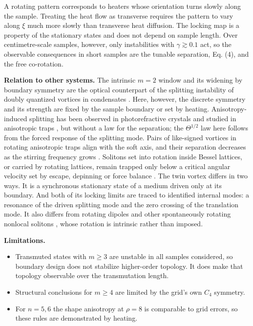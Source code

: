 A rotating pattern corresponds to heaters whose orientation turns slowly along the sample. Treating the heat flow as transverse requires the pattern to vary along \(\xi\) much more slowly than transverse heat diffusion. The locking map is a property of the stationary states and does not depend on sample length. Over centimetre-scale samples, however, only instabilities with \(\gamma \gtrsim 0.1\) act, so the observable consequences in short samples are the tunable separation, Eq. (4), and the free co-rotation.

\textbf{Relation to other systems.} The intrinsic \(m = 2\) window and its widening by boundary symmetry are the optical counterpart of the splitting instability of doubly quantized vortices in condensates \citep{Skryabin2001, Mottonen2003split, Shin2004dqv, Lundh2006, Kapitula2013krein}. Here, however, the discrete symmetry and its strength are fixed by the sample boundary or set by heating. Anisotropy-induced splitting has been observed in photorefractive crystals \citep{Mamaev1997decay} and studied in anisotropic traps \citep{Mottonen2003split, Xiong2020ring}, but without a law for the separation; the \(\Theta^{1/2}\) law here follows from the forced response of the splitting mode. Pairs of like-signed vortices in rotating anisotropic traps align with the soft axis, and their separation decreases as the stirring frequency grows \citep{McEndoo2009, McEndoo2010}. Solitons set into rotation inside Bessel lattices, or carried by rotating lattices, remain trapped only below a critical angular velocity set by escape, depinning or force balance \citep{KVT2004rotary, Sakaguchi2007rotating, Cuevas2007rotating}. The twin vortex differs in two ways. It is a synchronous stationary state of a medium driven only at its boundary. And both of its locking limits are traced to identified internal modes: a resonance of the driven splitting mode and the zero crossing of the translation mode. It also differs from rotating dipoles and other spontaneously rotating nonlocal solitons \citep{LopezAguayo2006, Skupin2008}, whose rotation is intrinsic rather than imposed.

\textbf{Limitations.}

\begin{itemize}
\tightlist
\item
  Transmuted states with \(m \ge 3\) are unstable in all samples considered, so boundary design does not stabilize higher-order topology. It does make that topology observable over the transmutation length.
\item
  Structural conclusions for \(m \ge 4\) are limited by the grid's own \(C_4\) symmetry.
\item
  For \(n = 5, 6\) the shape anisotropy at \(\rho = 8\) is comparable to grid errors, so these rules are demonstrated by heating.
\end{itemize}

